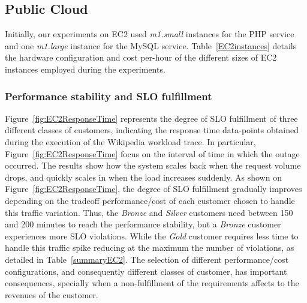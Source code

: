 

\subsection{Public Cloud}

Initially, our experiments on EC2 used \emph{m1.small} instances for the PHP service and one \emph{m1.large} instance for the MySQL service. Table~\ref{EC2instances} details the hardware configuration and cost per-hour of the different sizes of EC2 instances employed during the experiments.




\subsubsection{Performance stability and SLO fulfillment} 
Figure~\ref{fig:EC2ResponseTime} represents the degree of SLO fulfillment of three different classes of customers, indicating the response time data-points obtained during the execution of the Wikipedia workload trace. In particular, Figure~\ref{fig:EC2ResponseTime} focus on the interval of time in which the outage occurred. The results show how the system scales back when the request volume drops, and quickly scales in when the load increases suddenly. As shown on Figure~\ref{fig:EC2ResponseTime},  the degree of SLO fulfillment gradually improves depending on the tradeoff performance/cost of each customer chosen to handle this traffic variation. Thus, the \emph{Bronze} and \emph{Silver} customers need between 150 and 200 minutes to reach the performance stability,  but a \emph{Bronze} customer experiences more SLO violations. While the \emph{Gold} customer requires less time to handle this traffic spike reducing at the maximum the number of violations, as detailed in Table~\ref{summaryEC2}. The selection of different performance/cost configurations, and consequently different classes of customer, has important consequences, specially when a non-fulfillment of the requirements affects to the revenues of the customer.

